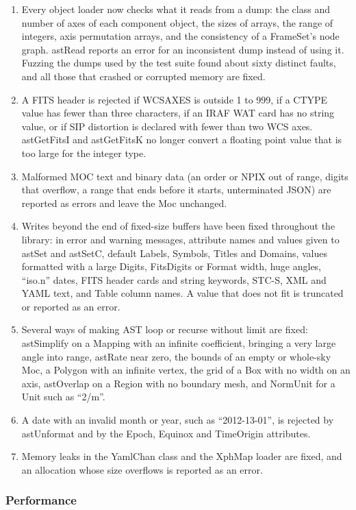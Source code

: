 \documentclass[twoside,11pt]{starlink}
\begin{document}
\begin{enumerate}
\item Every object loader now checks what it reads from a dump: the class and number of axes of each component object, the sizes of arrays, the range of integers, axis permutation arrays, and the consistency of a FrameSet's node graph.
  astRead reports an error for an inconsistent dump instead of using it.
  Fuzzing the dumps used by the test suite found about sixty distinct faults, and all those that crashed or corrupted memory are fixed.
\item A FITS header is rejected if WCSAXES is outside 1 to 999, if a CTYPE value has fewer than three characters, if an IRAF WAT card has no string value, or if SIP distortion is declared with fewer than two WCS axes.
  astGetFitsI and astGetFitsK no longer convert a floating point value that is too large for the integer type.
\item Malformed MOC text and binary data (an order or NPIX out of range, digits that overflow, a range that ends before it starts, unterminated JSON) are reported as errors and leave the Moc unchanged.
\item Writes beyond the end of fixed-size buffers have been fixed throughout the library: in error and warning messages, attribute names and values given to astSet and astSetC, default Labels, Symbols, Titles and Domains, values formatted with a large Digits, FitsDigits or Format width, huge angles, ``iso.n'' dates, FITS header cards and string keywords, STC-S, XML and YAML text, and Table column names.
  A value that does not fit is truncated or reported as an error.
\item Several ways of making AST loop or recurse without limit are fixed: astSimplify on a Mapping with an infinite coefficient, bringing a very large angle into range, astRate near zero, the bounds of an empty or whole-sky Moc, a Polygon with an infinite vertex, the grid of a Box with no width on an axis, astOverlap on a Region with no boundary mesh, and NormUnit for a Unit such as ``2/m''.
\item A date with an invalid month or year, such as ``2012-13-01'', is rejected by astUnformat and by the Epoch, Equinox and TimeOrigin attributes.
\item Memory leaks in the YamlChan class and the XphMap loader are fixed, and an allocation whose size overflows is reported as an error.
\end{enumerate}

\subsubsection{Performance}
\end{document}

